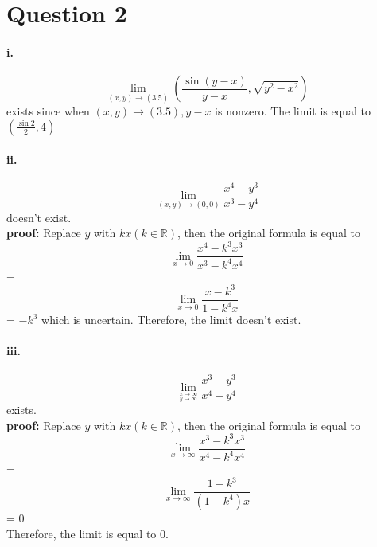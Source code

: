 \documentclass[11pt, a4paper]{article}
\begin{document}
\section*{Question 2}
\paragraph{i.}
$$\lim_{(x, y) \to (3.5)} (\frac{\sin (y - x)}{y - x}, \sqrt{y ^ 2 - x ^ 2})$$ exists  since when $(x, y) \to (3.5), y - x$ is nonzero. The limit is equal to $(\frac{\sin 2}{2}, 4)$
\paragraph{ii.}
$$\lim_{(x, y) \to (0, 0)} \frac{x ^ 4 - y ^ 3}{x ^ 3 - y ^ 4}$$ doesn't exist. \\
\textbf{proof:} Replace $y$ with $kx (k \in \mathbb{R})$, then the original formula is equal to $$\lim_{x \to 0} \frac{x ^ 4 - k ^ 3 x ^ 3}{x ^ 3 - k ^ 4 x ^ 4}$$ = $$\lim_{x \to 0} \frac{x - k ^ 3}{1 - k ^ 4 x}$$ = $-k ^ 3$ which is uncertain. Therefore, the limit doesn't exist.
\paragraph{iii.}
$$\lim\limits_{^{x \to \infty}_{y \to \infty}} \frac{x ^ 3 - y ^ 3}{x ^ 4 - y ^ 4}$$ exists. \\
\textbf{proof:} Replace $y$ with $kx (k \in \mathbb{R})$, then the original formula is equal to 
$$\lim_{x \to \infty} \frac{x ^ 3 - k ^ 3 x ^ 3}{x ^ 4 - k ^ 4 x ^ 4}$$ =
$$\lim_{x \to \infty} \frac{1 - k ^ 3}{(1 - k ^ 4)x}$$ = 
$0$ \\
Therefore, the limit is equal to 0.
\end{document}

